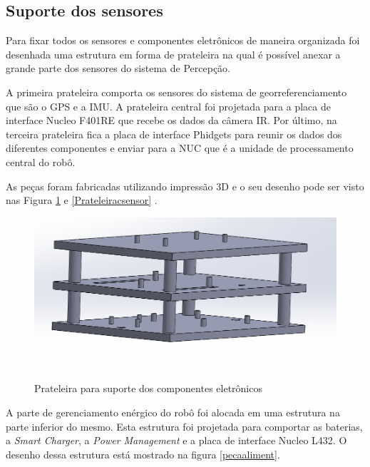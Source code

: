 \begin{itemize}
\section{Suporte dos sensores}

Para  fixar  todos  os  sensores  e  componentes  eletrônicos  de  maneira  organizada foi desenhada uma estrutura em forma de prateleira  na qual é possível anexar a grande parte dos sensores do sistema de Percepção.

A primeira prateleira comporta os sensores do sistema de georreferenciamento que são o GPS e a IMU. A prateleira central foi projetada para a placa de interface Nucleo F401RE que recebe os dados da câmera IR. Por último, na terceira prateleira fica a placa de interface Phidgets para reunir os dados dos diferentes componentes e enviar para a NUC que é a  unidade de processamento central do robô.

As peças foram fabricadas utilizando impressão 3D e o seu desenho pode ser visto nas Figura \ref{Prateleira} e \ref{Prateleiracsensor} .

\begin{figure}[h]
	\centering
	\includegraphics[width=14cm]{Figures/prateleira.png}
	\caption{Prateleira para suporte dos componentes eletrônicos} \label{Prateleira}
\end{figure}



A parte de gerenciamento enérgico do robô foi alocada em uma estrutura na parte inferior do mesmo. Esta estrutura foi projetada para comportar as baterias, a \textit{Smart Charger}, a \textit{Power Management} e a placa de interface Nucleo L432. O desenho dessa estrutura está mostrado na figura \ref{pecaaliment}.


\end{itemize}
